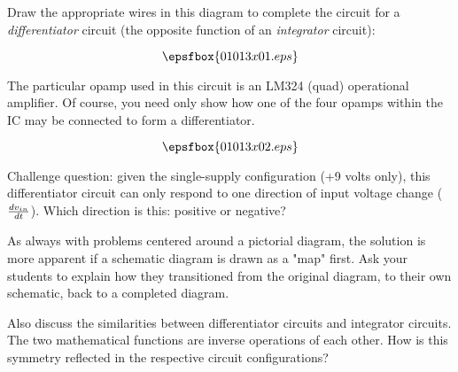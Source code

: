 

Draw the appropriate wires in this diagram to complete the circuit for a {\it differentiator} circuit (the opposite function of an {\it integrator} circuit):

$$\epsfbox{01013x01.eps}$$

The particular opamp used in this circuit is an LM324 (quad) operational amplifier.  Of course, you need only show how one of the four opamps within the IC may be connected to form a differentiator.







$$\epsfbox{01013x02.eps}$$

\vskip 10pt

Challenge question: given the single-supply configuration (+9 volts only), this differentiator circuit can only respond to one direction of input voltage change (${dv_{in} \over dt}$).  Which direction is this: positive or negative?







As always with problems centered around a pictorial diagram, the solution is more apparent if a schematic diagram is drawn as a "map" first.  Ask your students to explain how they transitioned from the original diagram, to their own schematic, back to a completed diagram.

Also discuss the similarities between differentiator circuits and integrator circuits.  The two mathematical functions are inverse operations of each other.  How is this symmetry reflected in the respective circuit configurations?




